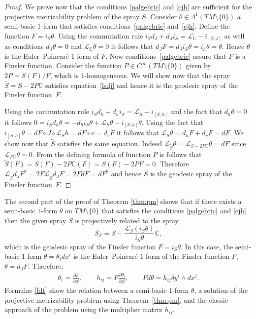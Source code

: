\documentclass[pdftex]{sigma}
\numberwithin{equation}{section}
\begin{document}
\begin{proof}
We prove now that the conditions \eqref{palgebric} and \eqref{cjh}  are
suf\/f\/icient for the projective metrizability problem of the spray $S$. Consider $\theta\in \Lambda^1(TM\setminus\{0\})$
a semi-basic $1$-form that sa\-tis\-f\/ies conditions~\eqref{palgebric}
and~\eqref{cjh}. Def\/ine the function $F=i_S\theta$. Using the commutation rule
$i_Sd_J+d_Ji_S=\mathcal{L}_{\mathbb{C}}-i_{[S,J]}$ as well as
conditions $d_J\theta=0$ and $\mathcal{L}_{\mathbb{C}}\theta=0$ it
follows that $d_JF=d_Ji_S\theta=i_h\theta=\theta$. Hence $\theta$
is the Euler--Poincar\'e $1$-form of $F$. Now conditions~\eqref{palgebric} assure that $F$ is a Finsler function. Consider
the function $P\in C^{\infty}(TM\setminus\{0\})$ given by
$2P=S(F)/F$, which is $1$-homogeneous. We will show now that the
spray $\tilde{S}=S-2P\mathbb{C}$ satisf\/ies equation~\eqref{lsdj}
and hence it is the geodesic spray of the Finsler function~$F$.

Using the commutation rule $i_Sd_h+d_hi_S=\mathcal{L}_S-
i_{[S,h]}$ and the fact that $d_h\theta=0$ it follows
$0=i_Sd_h\theta=-d_hi_S\theta+ \mathcal{L}_S\theta-
i_{[S,h]}\theta$. Using the fact that $i_{[S,h]}\theta=dF\circ
J\circ \mathcal{L}_Sh=dF\circ v=d_vF$ it follows that
$\mathcal{L}_S\theta=d_hF+d_vF=dF$. We show now that $\tilde{S}$
satisf\/ies the same equation. Indeed
$\mathcal{L}_{\tilde{S}}\theta=
\mathcal{L}_{S-2P\mathbb{C}}\theta=dF$ since
$\mathcal{L}_{P\mathbb{C}}\theta=0$. From the def\/ining formula of
function $P$ is follows that
$\tilde{S}(F)=S(F)-2P\mathbb{C}(F)=S(F)-2PF=0$. Therefore
$\mathcal{L}_{\tilde{S}}d_JF^2=2F\mathcal{L}_{\tilde{S}}d_JF=2FdF=dF^2$
and hence $\tilde{S}$ is the geodesic spray of the Finsler
function~$F$.
\end{proof}

The second part of the proof of Theorem \ref{thm:pm} shows that if
there exists a semi-basic $1$-form $\theta$ on $TM\setminus\{0\}$ that
satisf\/ies the conditions \eqref{palgebric} and \eqref{cjh} then the
given spray $S$ is projectively related to the spray
\[
 S_F=S-\frac{\mathcal{L}_{S}(i_S\theta)}{i_S\theta}\mathbb{C},
 \]
  which is
the geodesic spray of the Finsler function $F=i_S\theta$. In this
case, the semi-basic $1$-form $\theta=\theta_i dx^i$ is the
Euler--Poincar\'e $1$-form of the Finsler function $F$,
$\theta=d_JF$. Therefore,
\begin{gather} \theta_i=\frac{\partial F}{\partial y^i}, \qquad
  h_{ij}=F\frac{\partial \theta_i}{\partial
    y^j}, \qquad Fd\theta=h_{ij} \delta y^i \wedge
  dx^j. \label{fdt} \end{gather}
Formulae \eqref{fdt} show the relation between a semi-basic $1$-form
$\theta$, a solution of the projective metrizability problem using
Theorem~\ref{thm:pm}, and the classic approach of the problem using the
multiplier matrix $h_{ij}$.
\end{document}
